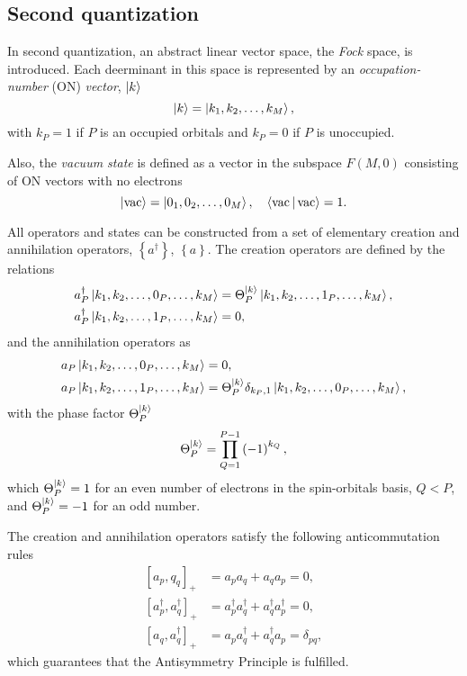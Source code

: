 \subsection{Second quantization} %
\label{sec:Second quantization}

In second quantization, an abstract linear vector space, the \textit{Fock} space,
is introduced.
Each deerminant in this space is represented by an \textit{occupation-number}
(ON) \textit{vector}, $ \Ket{k}$ 
\begin{equation}
    \Ket{k} =
    \Ket{k_1,k_2,\ldots,k_M}
    ,
\end{equation}
with $k_P = 1$ if $P$ is an occupied orbitals and $k_P = 0$ if $P$ is unoccupied.

Also, the \textit{vacuum state} is defined as a vector in the subspace
$F\left( M,0 \right)$ consisting of ON vectors with no electrons 
\begin{equation}
    \Ket{\text{vac}} =
    \Ket{0_1, 0_2, \ldots, 0_M}
    , \quad
    \Braket{\text{vac} | \text{vac}} = 1
    .
\end{equation}

All operators and states can be constructed from a set of elementary
creation and annihilation operators, $\left\{ a^{\dagger} \right\}$, 
$\left\{ a \right\}$.
The creation operators are defined by the relations
\begin{align}
    a_P^{\dagger} \Ket{k_1,k_2,\ldots,0_P,\ldots,k_M} &=
    \Theta_P^{\Ket{k}}
    \Ket{k_1, k_2, \ldots, 1_P, \ldots, k_M}
    , \\
    a_P^{\dagger} \Ket{k_1, k_2, \ldots, 1_P, \ldots, k_M} &= 0
    ,
\end{align}
and the annihilation operators as
\begin{align}
    a_P \Ket{k_1,k_2,\ldots,0_P,\ldots,k_M} &= 0
    , \\
    a_P \Ket{k_1, k_2, \ldots, 1_P, \ldots, k_M} &=
    \Theta_P^{\Ket{k}} \delta_{k_P,1}
    \Ket{k_1, k_2, \ldots, 0_P, \ldots, k_M}
    ,
\end{align}
with the phase factor $\Theta_P^{\Ket{k}}$  
\begin{equation}
    \Theta_P^{\Ket{k}} =
    \prod_{Q=1}^{P-1} \left( -1 \right)^{k_Q}
    ,
\end{equation}
which $\Theta_P^{\Ket{k}}=1$ for an even number of electrons in the spin-orbitals
basis, $Q < P$, and  $\Theta_P^{\Ket{k}}=-1$ for an odd number.

\begin{comentario}
The creation and annihilation operators satisfy the following anticommutation
rules
\begin{align}
    \left[ a_p,q_q \right]_{+}
    &=
    a_p a_q + a_q a_p = 0
    , \\
    \left[ a_p^{\dagger}, a_q^{\dagger} \right]_{+}
    &= a_p^{\dagger} a_q^{\dagger} + a_q^{\dagger} a_p^{\dagger} = 0
    , \\
    \left[ a_q, a_q^{\dagger} \right]_{+}
    &=
    a_p a_q^{\dagger} + a_q^{\dagger} a_p = \delta_{pq},
\end{align}
which guarantees that the Antisymmetry Principle is fulfilled.
\end{comentario}

